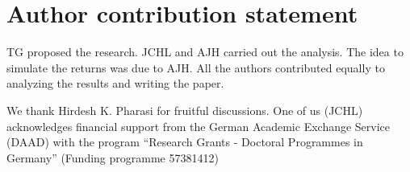 \section{Author contribution statement}

TG proposed the research. JCHL and AJH carried out the analysis. The
idea to simulate the returns was due to AJH. All the authors
contributed equally to analyzing the results and writing the paper.

We thank Hirdesh K. Pharasi for fruitful discussions. One of us (JCHL)
acknowledges financial support from the German Academic Exchange Service
(DAAD) with the program ``Research Grants - Doctoral Programmes in Germany''
(Funding programme 57381412)


